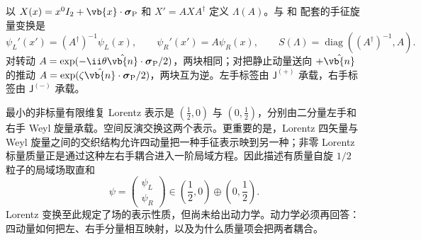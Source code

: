 

\begin{definition}
以 $X(x)=x^0I_2+\vb{x}\cdot\boldsymbol\sigma_{\rm P}$ 和 $X'=AXA^\dagger$ 定义 $\Lambda(A)$。与 和 配套的手征旋量变换是
\begin{equation}
 \psi_L'(x')=(A^\dagger)^{-1}\psi_L(x),\qquad
 \psi_R'(x')=A\psi_R(x),\qquad
 S(\Lambda)=\operatorname{diag}((A^\dagger)^{-1},A).
 \label{eq:feqo-sl2c-chiral-dictionary}
\end{equation}
对转动 $A=\exp(-\ii\theta\hat{\vb{n}}\cdot\boldsymbol\sigma_{\rm P}/2)$，两块相同；对把静止动量送向 $+\hat{\vb{n}}$ 的推动 $A=\exp(\zeta\hat{\vb{n}}\cdot\boldsymbol\sigma_{\rm P}/2)$，两块互为逆。左手标签由 $\mathsf J^{(+)}$ 承载，右手标签由 $\mathsf J^{(-)}$ 承载。
\end{definition}

最小的非标量有限维复 Lorentz 表示是 $(\tfrac12,0)$ 与 $(0,\tfrac12)$，分别由二分量左手和右手 Weyl 旋量承载。空间反演交换这两个表示。更重要的是，Lorentz 四矢量与 Weyl 旋量之间的交织结构允许四动量把一种手征表示映到另一种；非零 Lorentz 标量质量正是通过这种左右手耦合进入一阶局域方程。因此描述有质量自旋 $1/2$ 粒子的局域场取直和
\begin{equation}
 {
 \psi=\begin{pmatrix}\psi_L\\ \psi_R\end{pmatrix}
 \in \left(\frac12,0\right)\oplus\left(0,\frac12\right).}
 \label{eq:dirac-rep}
\end{equation}
Lorentz 变换至此规定了场的表示性质，但尚未给出动力学。动力学必须再回答：四动量如何把左、右手分量相互映射，以及为什么质量项会把两者耦合。

